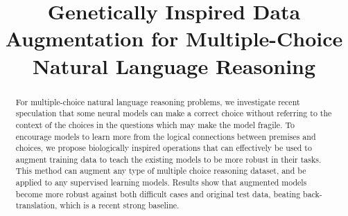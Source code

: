 \documentclass[letterpaper]{article} %
\title{Genetically Inspired Data Augmentation for 
Multiple-Choice Natural Language Reasoning}
\begin{document}
\maketitle

\begin{abstract}
For multiple-choice natural language reasoning problems, 
we investigate recent speculation that some neural models 
can make a correct choice without referring to the context of 
the choices in the questions which may make the model fragile. 
To encourage models to learn more from the logical connections between 
premises and choices, we propose biologically inspired operations 
that can effectively be used to augment training data to teach the existing
models to be more robust in their tasks. This method can augment
any type of multiple choice reasoning dataset, and be applied to
any supervised learning models. Results show that augmented models
become more robust against both difficult cases and original
test data, beating back-translation, which is a recent strong baseline.
\end{abstract}







%
\end{document}
